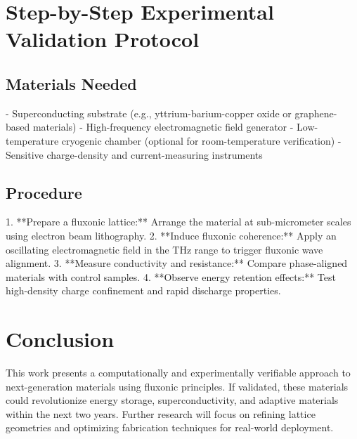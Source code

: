 \documentclass{article}
\begin{document}
\section{Step-by-Step Experimental Validation Protocol}
\subsection{Materials Needed}
- Superconducting substrate (e.g., yttrium-barium-copper oxide or graphene-based materials)
- High-frequency electromagnetic field generator
- Low-temperature cryogenic chamber (optional for room-temperature verification)
- Sensitive charge-density and current-measuring instruments

\subsection{Procedure}
1. **Prepare a fluxonic lattice:** Arrange the material at sub-micrometer scales using electron beam lithography.
2. **Induce fluxonic coherence:** Apply an oscillating electromagnetic field in the THz range to trigger fluxonic wave alignment.
3. **Measure conductivity and resistance:** Compare phase-aligned materials with control samples.
4. **Observe energy retention effects:** Test high-density charge confinement and rapid discharge properties.

\section{Conclusion}
This work presents a computationally and experimentally verifiable approach to next-generation materials using fluxonic principles. If validated, these materials could revolutionize energy storage, superconductivity, and adaptive materials within the next two years. Further research will focus on refining lattice geometries and optimizing fabrication techniques for real-world deployment.
\end{document}
